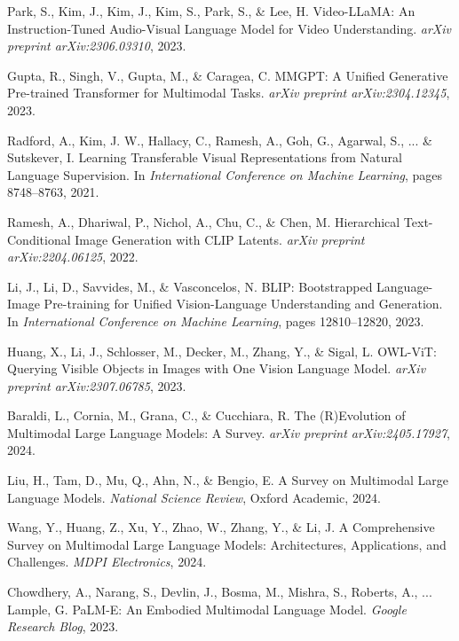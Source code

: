 \documentclass[conference]{IEEEtran}
\begin{document}
\begin{thebibliography}{999}
Park, S., Kim, J., Kim, J., Kim, S., Park, S., \& Lee, H.
\newblock Video-LLaMA: An Instruction-Tuned Audio-Visual Language Model for Video Understanding.
\newblock \emph{arXiv preprint arXiv:2306.03310}, 2023.

Gupta, R., Singh, V., Gupta, M., \& Caragea, C.
\newblock MMGPT: A Unified Generative Pre-trained Transformer for Multimodal Tasks.
\newblock \emph{arXiv preprint arXiv:2304.12345}, 2023.

Radford, A., Kim, J. W., Hallacy, C., Ramesh, A., Goh, G., Agarwal, S., ... \& Sutskever, I.
\newblock Learning Transferable Visual Representations from Natural Language Supervision.
\newblock In \emph{International Conference on Machine Learning}, pages 8748–8763, 2021.

Ramesh, A., Dhariwal, P., Nichol, A., Chu, C., \& Chen, M.
\newblock Hierarchical Text-Conditional Image Generation with CLIP Latents.
\newblock \emph{arXiv preprint arXiv:2204.06125}, 2022.

Li, J., Li, D., Savvides, M., \& Vasconcelos, N.
\newblock BLIP: Bootstrapped Language-Image Pre-training for Unified Vision-Language Understanding and Generation.
\newblock In \emph{International Conference on Machine Learning}, pages 12810–12820, 2023.

Huang, X., Li, J., Schlosser, M., Decker, M., Zhang, Y., \& Sigal, L.
\newblock OWL-ViT: Querying Visible Objects in Images with One Vision Language Model.
\newblock \emph{arXiv preprint arXiv:2307.06785}, 2023.

Baraldi, L., Cornia, M., Grana, C., \& Cucchiara, R.
\newblock The (R)Evolution of Multimodal Large Language Models: A Survey.
\newblock \emph{arXiv preprint arXiv:2405.17927}, 2024.

Liu, H., Tam, D., Mu, Q., Ahn, N., \& Bengio, E.
\newblock A Survey on Multimodal Large Language Models.
\newblock \emph{National Science Review}, Oxford Academic, 2024.

Wang, Y., Huang, Z., Xu, Y., Zhao, W., Zhang, Y., \& Li, J.
\newblock A Comprehensive Survey on Multimodal Large Language Models: Architectures, Applications, and Challenges.
\newblock \emph{MDPI Electronics}, 2024.

Chowdhery, A., Narang, S., Devlin, J., Bosma, M., Mishra, S., Roberts, A., ... Lample, G.
\newblock PaLM-E: An Embodied Multimodal Language Model.
\newblock \emph{Google Research Blog}, 2023.


\end{thebibliography}
\end{document}
